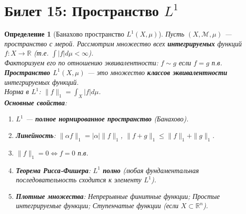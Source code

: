 \documentclass[a4paper, 12pt]{article}
\newtheorem{definition}{Определение}
\newcommand{\R}{\mathbb{R}}
\newcommand{\1}{\mathbf{1}}
\begin{document}
\section*{Билет 15: Пространство $L^1$}
\begin{definition}[Банахово пространство $L^1(X, \mu)$]
    Пусть $(X, \mathcal{M}, \mu)$ — пространство с мерой. Рассмотрим множество всех \textbf{интегрируемых} функций $f: X \to \R$ (т.е. $\int |f|  d\mu < \infty$). \\
    Факторизуем его по отношению эквивалентности: $f \sim g$ если $f = g$ п.в. \\
    \textbf{Пространство $L^1(X, \mu)$} — это множество \textbf{классов эквивалентности} интегрируемых функций. \\
    Норма в $L^1$: $\|f\|_1 = \int_X |f|  d\mu$. \\
    \textbf{Основные свойства}:
    \begin{enumerate}[label=(\arabic*)]
        \item $L^1$ — \textbf{полное нормированное пространство} (Банахово).
        \item \textbf{Линейность}: $\|\alpha f\|_1 = |\alpha| \|f\|_1$, $\|f + g\|_1 \leq \|f\|_1 + \|g\|_1$.
        \item $\|f\|_1 = 0 \Leftrightarrow f = 0$ п.в.
        \item \textbf{Теорема Рисса-Фишера}: $L^1$ \textbf{полно} (любая фундаментальная последовательность сходится к элементу $L^1$).
        \item \textbf{Плотные множества}: Непрерывные финитные функции; Простые интегрируемые функции; Ступенчатые функции (если $X \subset \R^n$).
    \end{enumerate}
\end{definition}

\end{document}
